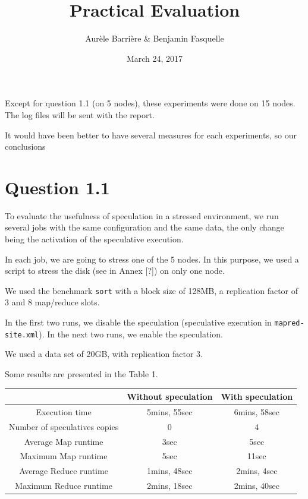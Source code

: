 \documentclass{article}
\author{Aur\`ele Barri\`ere \& Benjamin Fasquelle}
\title{Practical Evaluation}
\date{March 24, 2017}
\def\file#1{\texttt{#1}}
\def\bench#1{\texttt{#1}}
\begin{document}
\maketitle

Except for question 1.1 (on 5 nodes), these experiments were done on 15 nodes. The log files will be sent with the report.

It would have been better to have several measures for each experiments, so our conclusions

\section*{Question 1.1}
To evaluate the usefulness of speculation in a stressed environment, we run several jobs with the same configuration and the same data, the only change being the activation of the speculative execution.

In each job, we are going to stress one of the 5 nodes. In this purpose, we used a script to stress the disk (see in Annex [?]) on only one node.

We used the benchmark \bench{sort} with a block size of 128MB, a replication factor of 3 and 8 map/reduce slots.

In the first two runs, we disable the speculation (speculative execution in \file{mapred-site.xml}).
In the next two runs, we enable the speculation.


We used a data set of 20GB, with replication factor 3.

Some results are presented in the Table 1.

\begin{center}
\begin{tabular}{|c|c|c|}
\hline
\ & Without speculation & With speculation \\
\hline
Execution time & 5mins, 55sec & 6mins, 58sec \\
\hline
Number of speculatives copies & 0 & 4 \\
\hline
Average Map runtime & 3sec & 5sec \\
\hline
Maximum Map runtime & 5sec & 11sec \\
\hline
Average Reduce runtime & 1mins, 48sec & 2mins, 4sec \\
\hline
Maximum Reduce runtime & 2mins, 18sec & 2mins, 40sec \\
\hline
\end{tabular}
\end{center}
\end{document}
